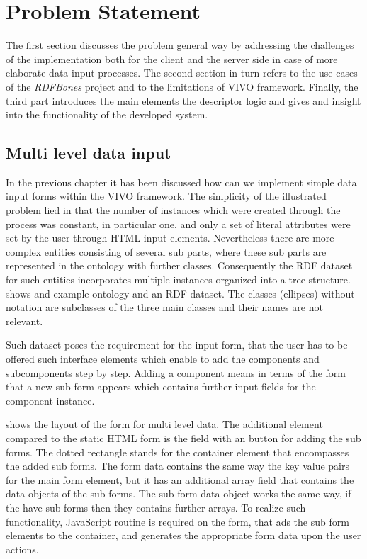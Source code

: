 \chapter{Problem Statement}

The first section discusses the problem general way by addressing the challenges of the implementation both for the client and the server side in case of more elaborate data input processes. The second section in turn refers to the use-cases of the \textit{RDFBones} project and to the limitations of VIVO framework. Finally, the third part introduces the main elements the descriptor logic and gives and insight into the functionality of the developed system. 

\section{Multi level data input}

In the previous chapter it has been discussed how can we implement simple data input forms within the VIVO framework. The simplicity of the illustrated problem lied in that the number of instances which were created through the process was constant, in particular one, and only a set of literal attributes were set by the user through HTML input elements. Nevertheless there are more complex entities consisting of several sub parts, where these sub parts are represented in the ontology with further classes. Consequently the RDF dataset for such entities incorporates multiple instances organized into a tree structure.  shows and example ontology and an RDF dataset. The classes (ellipses) without notation are subclasses of the three main classes and their names are not relevant.


Such dataset poses the requirement for the input form, that the user has to be offered such interface elements which enable to add the components and subcomponents step by step. Adding a component means in terms of the form that a new sub form appears which contains further input fields for the component instance.


 shows the layout of the form for multi level data. The additional element compared to the static HTML form is the field with an button for adding the sub forms. The dotted rectangle stands for the container element that encompasses the added sub forms. The form data contains the same way the key value pairs for the main form element, but it has an additional array field that contains the data objects of the sub forms. The sub form data object works the same way, if the have sub forms then they contains further arrays. To realize such functionality, JavaScript routine is required on the form, that ads the sub form elements to the container, and generates the appropriate form data upon the user actions.

